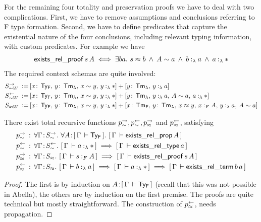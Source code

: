 For the remaining four totality and preservation proofs we have to deal with two complications.
First, we have to remove assumptions and conclusions referring to F type formation.
Second, we have to define predicates that capture the existential nature of the four conclusions, including relevant typing information, with custom predicates.
For example we have
\begin{align*}
  \mathsf{exists\_rel\_proof}\,s\,A \iff \mEx{ba} s \tmr b \mAnd A \tyr a \mAnd \typingLh{b}{a} \mAnd \typingLh{a}{\Prp}
\end{align*}
The required context schemas are quite involved:
\begin{align*}
  S_{\tyr W}^{\rightarrow} \eqdef &[x\sof\TyF \ssep y\sof\TmL \ssep x \tyr y \ssep \typingLh{y}{\Prp}] + [y\sof\TmL \ssep \typingLh{y}{a}]\\
  S_{\tyr W}^{\leftarrow} \eqdef &[x\sof\TyF \ssep y\sof\TmL \ssep x \tyr y \ssep \typingLh{y}{\Prp}] + [y\sof\TmL \ssep \typingLh{y}{a} \ssep A \tyr a \ssep \typingLh{a}{\Prp}]\\
  S_{\tmr W} \eqdef &[x\sof\TyF \ssep y\sof\TmL \ssep x \tyr y \ssep \typingLh{y}{\Prp}] + [x\sof\TmF \ssep y\sof\TmL \ssep x \tmr y \ssep \typingFh{x}{A} \ssep \typingLh{y}{a} \ssep A \tyr a]
\end{align*}
\begin{lemma}
  There exist total recursive functions $p^{\rightarrow}_{\mathrel{\sim}},p^{\leftarrow}_{\mathrel{\sim}},p^{\rightarrow}_{\mathrel{\approx}}$ and $p^{\leftarrow}_{\mathrel{\approx}}$, satisfying
  \begin{align*}
    p^{\rightarrow}_{\tyr} &\OF  \mAll{\Gamma \of S_{\tyr}^{\rightarrow}} \mAll{A \of \bc{\Gamma}{\TyF}} \bc{\Gamma}{\mathsf{exists\_rel\_prop}\,A}\\
    p^{\leftarrow}_{\tyr} &\OF \mAll{\Gamma \of S_{\tyr}^{\leftarrow}} \bc{\Gamma}{\typingLh{a}{\Prp}} \implies \bc{\Gamma}{\mathsf{exists\_rel\_type}\,a}\\
    p^{\rightarrow}_{\tmr} &\OF \mAll{\Gamma \of S_{\tmr}} \bc{\Gamma}{\typingFh{s}{A}} \implies \bc{\Gamma}{\mathsf{exists\_rel\_proof}\,s\,A}\\
    p^{\leftarrow}_{\tmr} &\OF \mAll{\Gamma \of S_{\tmr}} \bc{\Gamma}{\typingLh{b}{a}} \implies \bc{\Gamma}{\typingLh{a}{\Prp}} \implies \bc{\Gamma}{\mathsf{exists\_rel\_term}\,b\,a}
  \end{align*}
\end{lemma}
\begin{proof}
  The first is by induction on $A \!:\! [\,\Gamma\,\vdash \mathsf{Ty_{F}}\,]$ (recall that this was not possible in Abella), the others are by induction on the first premise.
  The proofs are quite technical but mostly straightforward.
  The construction of $p^{\leftarrow}_{\mathrel{\approx}}$, needs \SysL propagation.
\end{proof}

